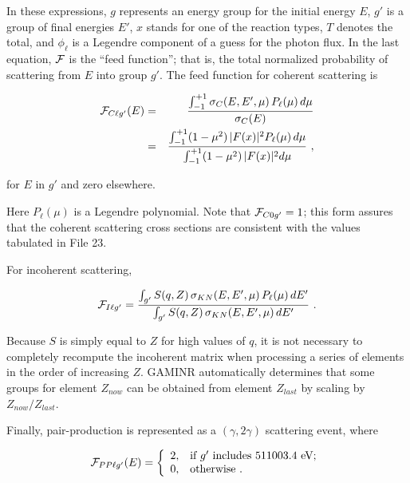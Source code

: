 \noindent
In these expressions, $g$ represents an energy group for the initial
energy $E$, $g'$ is a group of final energies $E'$, $x$ stands for one
of the reaction types, $T$ denotes the total, and $\phi_\ell$ is a
Legendre component of a guess for the photon flux.  In the last equation,
${\cal F}$ is the ``feed function''; that is, the total normalized
probability of scattering from $E$ into group $g'$.  The feed function
for coherent scattering is

  \begin{eqnarray}
    {\cal F}_{C\ell g'}(E)
    &=&{{\int_{-1}^{+1}\sigma_C(E,E',\mu)\,P_\ell(\mu)\,d\mu}
    \over { \sigma_C(E)}}  \nonumber\\
    &=&{{\int_{-1}^{+1}(1-\mu^2)\,|F(x)|^2P_\ell(\mu)\,d\mu}\over
    {\int_{-1}^{+1}(1-\mu^2)\,|F(x)|^2d\mu}}  \,\,,
  \label{eq10}
  \end{eqnarray}

\noindent for $E$ in $g'$ and zero elsewhere.

Here $P_\ell (\mu)$ is a Legendre polynomial.  Note that
${\cal F}_{C0g'}=1$;  this
form assures that the coherent scattering cross sections are
consistent with the values tabulated in File 23.

For incoherent scattering,

  \begin{equation}
    {\cal F}_{I\ell g'}={{\int_{g'}S(q,Z)\,\sigma_{KN}(E,E',\mu)\,
    P_\ell(\mu)\,dE'} \over
    {\int_{g'}S(q,Z)\,\sigma_{KN}(E,E',\mu)\,dE'}}  \,\,.
  \label{eq11}
  \end{equation}

\noindent
Because $S$ is simply equal to $Z$ for high values of $q$, it is not
necessary to completely recompute the incoherent matrix when
processing a series of elements in the order of increasing $Z$.  GAMINR
automatically determines that some groups for element $Z_{now}$ can be
obtained from element $Z_{last}$ by scaling by $Z_{now}/Z_{last}$.

Finally, pair-production is represented as a $(\gamma,2\gamma)$
scattering event, where

  \begin{equation}
    {\cal F}_{PP\ell g'}(E)=\left\{
    \begin{array}{ll}
     2,&\mbox{if $g'$ includes 511003.4 eV;}\\
     0,&\mbox{otherwise\,\,.}
    \end{array}
    \right.
  \end{equation}

